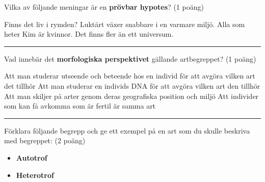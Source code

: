 \documentclass{exam}
\begin{document}
\vspace{5mm} %
\begin{center}
\end{center}
\vspace{5mm} %

\begin{questions}

\question Vilka av följande meningar är en \textbf{prövbar hypotes}? (1 poäng)
\begin{checkboxes}
   \choice Finns det liv i rymden?
   \choice Luktärt växer snabbare i en varmare miljö.
   \choice Alla som heter Kim är kvinnor.
   \choice Det finns fler än ett universum.
\end{checkboxes}

\vspace{5mm} 
\hrule 
\vspace{5mm} 

\question Vad innebär det \textbf{morfologiska perspektivet} gällande artbegreppet? (1 poäng)
\begin{checkboxes}
   \choice Att man studerar utseende och beteende hos en individ för att avgöra vilken art det tillhör
   \choice Att man studerar en individs DNA för att avgöra vilken art den tillhör
   \choice Att man skiljer på arter genom deras geografiska position och miljö
   \choice Att individer som kan få avkomma som är fertil är samma art
\end{checkboxes}

\vspace{5mm} 
\hrule 
\vspace{5mm} 

\question Förklara följande begrepp och ge ett exempel på en art som du skulle beskriva med begreppet: (2 poäng)
    \vspace{5mm} 
\begin{itemize}
     \item \textbf{Autotrof}
     \vspace{10mm} 
     \item \textbf{Heterotrof}
     \vspace{10mm} 
\end{itemize}


\end{questions}
\end{document}
